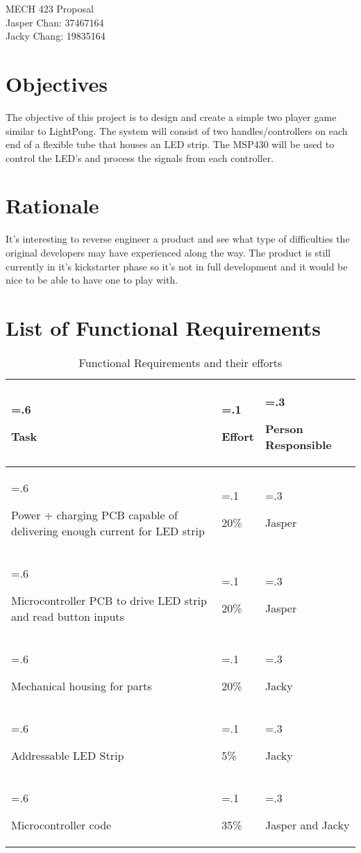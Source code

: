 \documentclass{notes}
\begin{document}
\vspace*{\fill}
\begin{center}
{\centering\huge{MECH 423 Proposal}}\\
\vspace*{2em}
{\large Jasper Chan: 37467164 }\\
{\large Jacky Chang: 19835164 }
\end{center}
\vspace*{\fill}
\newpage
\section{Objectives}

The objective of this project is to design and create a simple two player game similar to LightPong\footnotemark.
The system will consist of two handles/controllers on each end of a flexible tube that houses an LED strip.
The MSP430 will be used to control the LED's and process the signals from each controller.

\section{Rationale}

It's interesting to reverse engineer a product and see what type of difficulties the original developers may have experienced along the way.
The product is still currently in it's kickstarter phase so it's not in full development and it would be nice to be able to have one to play with.

\section{List of Functional Requirements}

\begin{table}[H]
    \centering
    \begin{tabularx}{\textwidth}{>{\hsize=.6\hsize\raggedright}X>{\hsize=.1\hsize\raggedright}X>{\hsize=.3\hsize\raggedright\arraybackslash}X}
        Task & Effort & Person Responsible  \\\toprule
         Power + charging PCB capable of delivering enough current for LED strip&20\% & Jasper\\\midrule
         Microcontroller PCB to drive LED strip and read button inputs & 20\% & Jasper\\\midrule
         Mechanical housing for parts& 20\% & Jacky\\\midrule
         Addressable LED Strip& 5\% & Jacky\\ \midrule
         Microcontroller code & 35\% & Jasper and Jacky\\\bottomrule
    \end{tabularx}
    \caption{Functional Requirements and their efforts}
    \label{tab:funcreq}
\end{table}
\end{document}
